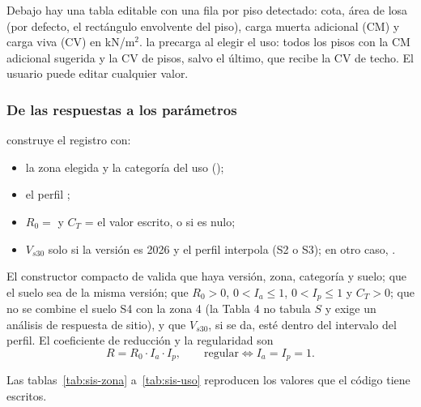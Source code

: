 Debajo hay una tabla editable con una fila por piso detectado: cota, área de losa (por defecto, el rectángulo envolvente
del piso), carga muerta adicional (CM) y carga viva (CV) en kN/m$^2$. 
la precarga al elegir el uso: todos los pisos con la CM adicional sugerida y la CV de pisos, salvo el último, que recibe
la CV de techo. El usuario puede editar cualquier valor.

\subsubsection{De las respuestas a los parámetros}

 construye el registro  con:

\begin{itemize}
	\item la zona elegida y la categoría del uso ();
	\item el perfil ;
	\item $R_0 = $  y $C_T$ = el valor escrito, o  si es nulo;
	\item $V_{s30}$ solo si la versión es 2026 y el perfil interpola (S2 o S3); en otro caso, .
\end{itemize}

El constructor compacto de  valida que haya versión, zona, categoría y suelo; que el suelo sea de la
misma versión; que $R_0 > 0$, $0 < I_a \le 1$, $0 < I_p \le 1$ y $C_T > 0$; que no se combine el suelo S4 con la zona 4
(la Tabla 4 no tabula $S$ y exige un análisis de respuesta de sitio), y que $V_{s30}$, si se da, esté dentro del intervalo
del perfil. El coeficiente de reducción y la regularidad son
\begin{equation}
	R = R_0 \cdot I_a \cdot I_p, \qquad \text{regular} \iff I_a = I_p = 1 .
	\label{eq:sis-r}
\end{equation}

Las tablas~\ref{tab:sis-zona} a~\ref{tab:sis-uso} reproducen los valores que el código tiene escritos.

